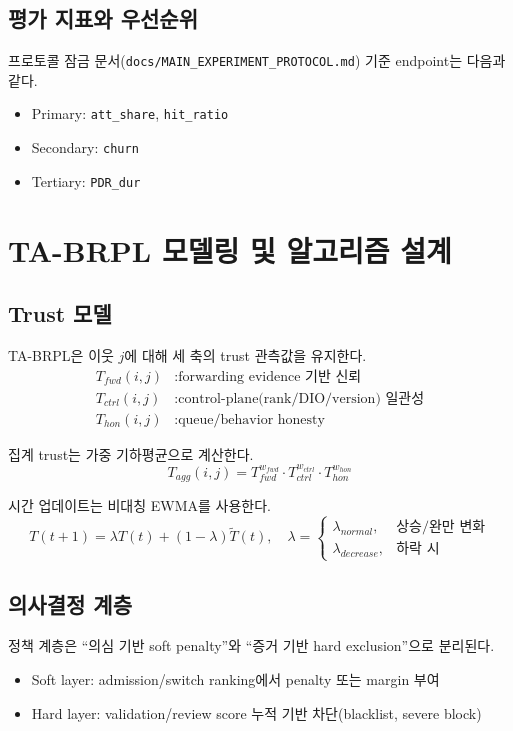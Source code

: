 \documentclass[11pt,a4paper]{report}
\begin{document}
\section{평가 지표와 우선순위}
프로토콜 잠금 문서(\texttt{docs/MAIN\_EXPERIMENT\_PROTOCOL.md}) 기준 endpoint는 다음과 같다.
\begin{itemize}
  \item Primary: \texttt{att\_share}, \texttt{hit\_ratio}
  \item Secondary: \texttt{churn}
  \item Tertiary: \texttt{PDR\_dur}
\end{itemize}

\chapter{TA-BRPL 모델링 및 알고리즘 설계}
\section{Trust 모델}
TA-BRPL은 이웃 $j$에 대해 세 축의 trust 관측값을 유지한다.
\begin{align}
T_{fwd}(i,j) &: \text{forwarding evidence 기반 신뢰} \\
T_{ctrl}(i,j) &: \text{control-plane(rank/DIO/version) 일관성} \\
T_{hon}(i,j) &: \text{queue/behavior honesty}
\end{align}

집계 trust는 가중 기하평균으로 계산한다.
\begin{equation}
T_{agg}(i,j)=T_{fwd}^{w_{fwd}}\cdot T_{ctrl}^{w_{ctrl}}\cdot T_{hon}^{w_{hon}}
\end{equation}

시간 업데이트는 비대칭 EWMA를 사용한다.
\begin{equation}
T(t+1)=\lambda T(t)+(1-\lambda)\tilde{T}(t),\quad
\lambda=\begin{cases}
\lambda_{normal}, & \text{상승/완만 변화}\\
\lambda_{decrease}, & \text{하락 시}
\end{cases}
\end{equation}

\section{의사결정 계층}
정책 계층은 ``의심 기반 soft penalty''와 ``증거 기반 hard exclusion''으로 분리된다.
\begin{itemize}
  \item Soft layer: admission/switch ranking에서 penalty 또는 margin 부여
  \item Hard layer: validation/review score 누적 기반 차단(blacklist, severe block)
\end{itemize}
\end{document}
